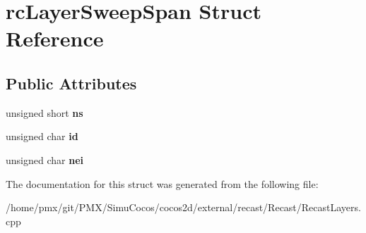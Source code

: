 \hypertarget{structrcLayerSweepSpan}{}\section{rc\+Layer\+Sweep\+Span Struct Reference}
\label{structrcLayerSweepSpan}
\subsection*{Public Attributes}
\begin{DoxyCompactItemize}
\item 
\mbox{\label{structrcLayerSweepSpan_a7106ea090c417b32ef87c78a3940b997}} 
unsigned short {\bfseries ns}
\item 
\mbox{\label{structrcLayerSweepSpan_a16f6f61547ed2e1c6f22b6e17810785e}} 
unsigned char {\bfseries id}
\item 
\mbox{\label{structrcLayerSweepSpan_ae002a2c1f59bcd05df6661734ba7e466}} 
unsigned char {\bfseries nei}
\end{DoxyCompactItemize}


The documentation for this struct was generated from the following file\+:\begin{DoxyCompactItemize}
\item 
/home/pmx/git/\+P\+M\+X/\+Simu\+Cocos/cocos2d/external/recast/\+Recast/Recast\+Layers.\+cpp\end{DoxyCompactItemize}
